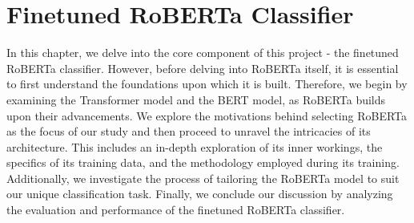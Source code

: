 \documentclass[a4paper,10pt]{report} %
\begin{document}
\chapter{Finetuned RoBERTa Classifier}
In this chapter, we delve into the core component of this project - the finetuned RoBERTa classifier. However, before delving into RoBERTa itself, it is essential to first understand the foundations upon which it is built. Therefore, we begin by examining the Transformer model and the BERT model, as RoBERTa builds upon their advancements. We explore the motivations behind selecting RoBERTa as the focus of our study and then proceed to unravel the intricacies of its architecture. This includes an in-depth exploration of its inner workings, the specifics of its training data, and the methodology employed during its training. Additionally, we investigate the process of tailoring the RoBERTa model to suit our unique classification task. Finally, we conclude our discussion by analyzing the evaluation and performance of the finetuned RoBERTa classifier.
\end{document}
